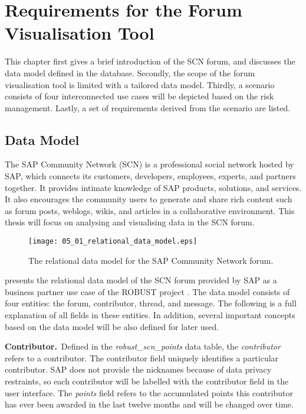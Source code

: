 \chapter{Requirements for the Forum Visualisation Tool} \label{Chapter:Requirements}

This chapter first gives a brief introduction of the SCN forum, and discusses the data model defined in the database. Secondly, the scope of the forum visualisation tool is limited with a tailored data model. Thirdly, a scenario consists of four interconnected use cases will be depicted based on the risk management. Lastly, a set of requirements derived from the scenario are listed.

\section{Data Model} \label{sec:data_model}
The SAP Community Network (SCN) is a professional social network hosted by SAP, which connects its customers, developers, employees, experts, and partners together.  It provides intimate knowledge of SAP products, solutions, and services. It also encourages the community users to generate and share rich content such as forum posts, weblogs, wikis, and articles in a collaborative environment. This thesis will focus on analysing and visualising data in the SCN forum.

\begin{figure}[!htb]
  \centering
  \texttt{[image: 05\_01\_relational\_data\_model.eps]}
  \caption{The relational data model for the SAP Community Network forum.}
  \label{Figure:05_01}
\end{figure}
 presents the relational data model of the SCN forum provided by SAP as a business partner use case of the ROBUST project \citep{Adrian2011}. The data model consists of four entities: the forum, contributor, thread, and message. The following is a full explanation of all fields in these entities. In addition, several important concepts based on the data model will be also defined for later used.

\textbf{Contributor.}~Defined in the \emph{robust\_scn\_points} data table, the \emph{contributor} refers to a contributor. The contributor field uniquely identifies a particular contributor. SAP does not provide the nicknames because of data privacy restraints, so each contributor will be labelled with the contributor field in the user interface. The \emph{points} field refers to the accumulated points this contributor has ever been awarded in the last twelve months and will be changed over time.

